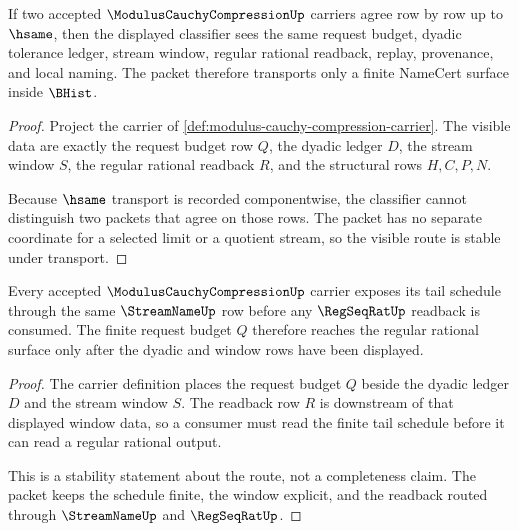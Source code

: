 \begin{theorem}
\label{thm:modulus-cauchy-compression-classifier-transport}
If two accepted $\ModulusCauchyCompressionUp$ carriers agree row by row up to $\hsame$, then the displayed classifier sees the same request budget, dyadic tolerance ledger, stream window, regular rational readback, replay, provenance, and local naming. The packet therefore transports only a finite NameCert surface inside $\BHist$.
\end{theorem}
\begin{proof}
Project the carrier of \autoref{def:modulus-cauchy-compression-carrier}. The visible data are exactly the request budget row $Q$, the dyadic ledger $D$, the stream window $S$, the regular rational readback $R$, and the structural rows $H,C,P,N$.

Because $\hsame$ transport is recorded componentwise, the classifier cannot distinguish two packets that agree on those rows. The packet has no separate coordinate for a selected limit or a quotient stream, so the visible route is stable under transport.
\end{proof}

\begin{theorem}
\label{thm:modulus-cauchy-compression-tail-stability}
Every accepted $\ModulusCauchyCompressionUp$ carrier exposes its tail schedule through the same $\StreamNameUp$ row before any $\RegSeqRatUp$ readback is consumed. The finite request budget $Q$ therefore reaches the regular rational surface only after the dyadic and window rows have been displayed.
\end{theorem}
\begin{proof}
The carrier definition places the request budget $Q$ beside the dyadic ledger $D$ and the stream window $S$. The readback row $R$ is downstream of that displayed window data, so a consumer must read the finite tail schedule before it can read a regular rational output.

This is a stability statement about the route, not a completeness claim. The packet keeps the schedule finite, the window explicit, and the readback routed through $\StreamNameUp$ and $\RegSeqRatUp$.
\end{proof}

